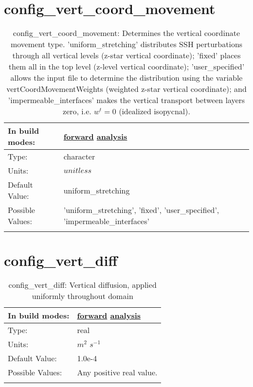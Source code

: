 \section[config\_vert\_coord\_movement]{config\_vert\_coord\_movement}
\label{sec:nm_sec_config_vert_coord_movement}
\begin{center}
\begin{longtable}{| p{2.0in} || p{4.0in} |}
    \hline
    In build modes: & \hyperref[subsec:forward_nm_tab_ALE_vertical_grid]{forward} \hyperref[subsec:analysis_nm_tab_ALE_vertical_grid]{analysis} \\
    \hline
    Type: & character \\
    \hline
    Units: & $unitless$ \\
    \hline
    Default Value: & uniform\_stretching \\
    \hline
    Possible Values: & 'uniform\_stretching', 'fixed', 'user\_specified', 'impermeable\_interfaces' \\
    \hline
    \caption{config\_vert\_coord\_movement:  Determines the vertical coordinate movement type. 'uniform\_stretching' distributes SSH perturbations through all vertical levels (z-star vertical coordinate); 'fixed' places them all in the top level (z-level vertical coordinate); 'user\_specified' allows the input file to determine the distribution using the variable vertCoordMovementWeights (weighted z-star vertical coordinate); and 'impermeable\_interfaces' makes the vertical transport between layers zero, i.e.  $w^t=0$  (idealized isopycnal).}
\end{longtable}
\end{center}
\section[config\_vert\_diff]{config\_vert\_diff}
\label{sec:nm_sec_config_vert_diff}
\begin{center}
\begin{longtable}{| p{2.0in} || p{4.0in} |}
    \hline
    In build modes: & \hyperref[subsec:forward_nm_tab_vmix_const]{forward} \hyperref[subsec:analysis_nm_tab_vmix_const]{analysis} \\
    \hline
    Type: & real \\
    \hline
    Units: & $m^2$ $s^{-1}$ \\
    \hline
    Default Value: & 1.0e-4 \\
    \hline
    Possible Values: & Any positive real value. \\
    \hline
    \caption{config\_vert\_diff: Vertical diffusion, applied uniformly throughout domain}
\end{longtable}
\end{center}
